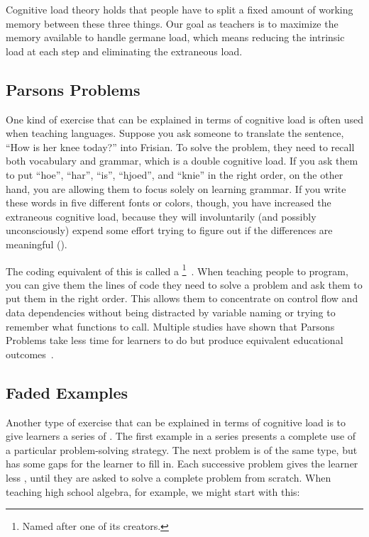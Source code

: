 Cognitive load theory holds that people have to split a fixed amount of working memory between these three things.
Our goal as teachers is to maximize the memory available to handle germane load,
which means reducing the intrinsic load at each step and eliminating the extraneous load.

\subsection*{Parsons Problems}

One kind of exercise that can be explained in terms of cognitive load
is often used when teaching languages.
Suppose you ask someone to translate the sentence, ``How is her knee today?'' into Frisian.
To solve the problem,
they need to recall both vocabulary and grammar,
which is a double cognitive load.
If you ask them to put ``hoe'', ``har'', ``is'', ``hjoed'', and ``knie'' in the right order,
on the other hand,
you are allowing them to focus solely on learning grammar.
If you write these words in five different fonts or colors,
though,
you have increased the extraneous cognitive load,
because they will involuntarily (and possibly unconsciously) expend some effort
trying to figure out if the differences are meaningful
().


The coding equivalent of this
is called a \footnote{Named after one of its creators.}~\cite{Pars2006}.
When teaching people to program,
you can give them the lines of code they need to solve a problem
and ask them to put them in the right order.
This allows them to concentrate on control flow and data dependencies
without being distracted by variable naming or trying to remember what functions to call.
Multiple studies have shown that Parsons Problems take less time for learners to do
but produce equivalent educational outcomes~\cite{Eric2017}.

\subsection*{Faded Examples}

Another type of exercise that can be explained in terms of cognitive load
is to give learners a series of .
The first example in a series presents a complete use of a particular problem-solving strategy.
The next problem is of the same type,
but has some gaps for the learner to fill in.
Each successive problem gives the learner less ,
until they are asked to solve a complete problem from scratch.
When teaching high school algebra,
for example,
we might start with this:

